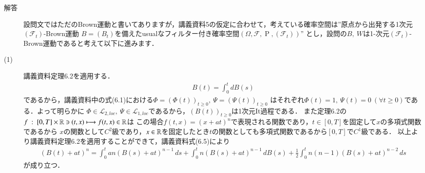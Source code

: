 \begin{description}
	\item[解答] 設問文ではただのBrown運動と書いてありますが，講義資料5の仮定に合わせて，考えている確率空間は''原点から出発する1次元$(\mathcal{F}_t)$-Brown運動
		$B = (B_t)$を備えたusualなフィルター付き確率空間$(\Omega, \mathcal{F}, \operatorname{P}, (\mathcal{F}_t))$''
		とし，設問の$B,\ W$は1-次元$(\mathcal{F}_t)$-Brown運動であると考えて以下に進みます．
	\item[(1)] 講義資料定理6.2を適用する．
		\begin{align}
			B(t) = \int_{0}^{t} dB(s)
		\end{align}
		であるから，講義資料中の式(6.1)における$\Phi = (\Phi(t))_{t \geq 0},\ \Psi = (\Psi(t))_{t \geq 0}$
		はそれぞれ$\Phi(t) = 1,\ \Psi(t) = 0\ (\forall t \geq 0)$である．よって明らかに
		$\Phi \in \mathcal{L}_{2,loc},\ \Psi \in \mathcal{L}_{1,loc}$であるから，$(B(t))_{t \geq 0}$は1次元It過程である．
		また定理6.2の$f\ :\ [0, T] \times \mathbb{R} \ni (t,x) \longmapsto f(t,x) \in \mathbb{R}$は
		この場合$f(t,x) = (x + at)^n$で表現される関数であり，$t \in [0,T]$を固定して$x$の多項式関数であるから
		$x$の関数として$C^2$級であり，$x \in \mathbb{R}$を固定したとき$t$の関数としても多項式関数であるから$[0, T]$で$C^1$級である．
		以上より講義資料定理6.2を適用することができて，講義資料式(6.5)により
		\begin{align}
			\left(B(t) + at\right)^n = %
			\int_{0}^{t} an(B(s) + at)^{n-1}\, ds
				+ \int_{0}^{t} n(B(s) + at)^{n-1}\, dB(s)
				+ \frac{1}{2} \int_{0}^{t} n(n-1)(B(s) + at)^{n-2}\, ds
		\end{align}
		が成り立つ．
	

\end{description}
